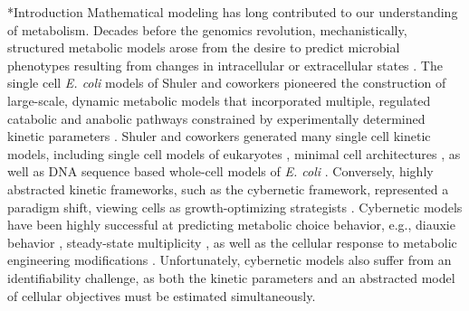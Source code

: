 \documentclass[12pt]{article}
\makeatletter
\renewcommand\section{\@startsection
	{subsection}{2}{0mm}
	{-0.2in}
	{0.05\baselineskip}
	{\normalfont\large\bfseries}}
\makeatother
\begin{document}
\section*{Introduction}
Mathematical modeling has long contributed to our understanding of metabolism. 
Decades before the genomics revolution, mechanistically, structured metabolic models arose from the desire to predict microbial phenotypes resulting from 
changes in intracellular or extracellular states \citep{1976_fredrickson_BiotechBioeng}. 
The single cell \textit{E. coli} models of Shuler and coworkers pioneered the construction of large-scale, dynamic metabolic models that incorporated multiple, regulated catabolic and anabolic 
pathways constrained by experimentally determined kinetic parameters \citep{1984_domach_shuler_BiotechBioeng_01}. 
Shuler and coworkers generated many single cell kinetic models, including single cell models of eukaryotes \citep{1989_steinmeyer_shuler_ChemEngSci,1992_wu_shuler_AnnNYAcadSci}, minimal cell architectures \citep{2004_castellanos_shuler_PNAS}, as well as DNA sequence based whole-cell models of \textit{E. coli} \citep{2008_atlas_shuler_IETSysBio}.
Conversely, highly abstracted kinetic frameworks, such as the cybernetic framework, represented a paradigm shift, viewing cells as growth-optimizing strategists \citep{1985_dhurjati_ramkrishna_tsao_BiotechBioeng}. 
Cybernetic models have been highly successful at predicting metabolic choice behavior, e.g., diauxie behavior \citep{1986_kompala_ramkrishna_tsao_BiotechBioeng}, 
steady-state multiplicity \citep{2012_kim_ramkrishna_BiotechProg}, as well as the cellular response to metabolic engineering modifications \citep{1999_varner_ramkrishna_MetaEng}. 
Unfortunately, cybernetic models also suffer from an identifiability challenge, as both the kinetic parameters and an abstracted model of cellular objectives must be estimated simultaneously. 
\end{document}
